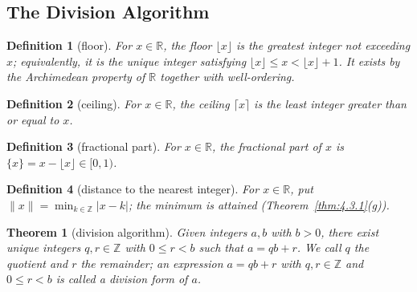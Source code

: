 \documentclass[11pt]{article}
\theoremstyle{ntstyle}
\newtheorem{theorem}{Theorem}[subsection]
\newtheorem{definition}{Definition}[subsection]
\begin{document}
\subsection{The Division Algorithm}

\begin{definition}[floor]\label{def:1.2.1}
	For $x\in\mathbb{R}$, the floor $\lfloor x\rfloor$ is the greatest integer not exceeding $x$; equivalently, it is the unique integer satisfying $\lfloor x\rfloor\le x<\lfloor x\rfloor+1$.
	It exists by the Archimedean property of $\mathbb{R}$ together with well-ordering.

\end{definition}
\begin{definition}[ceiling]\label{def:1.2.2}
	For $x\in\mathbb{R}$, the ceiling $\lceil x\rceil$ is the least integer greater than or equal to $x$.

\end{definition}
\begin{definition}[fractional part]\label{def:1.2.3}
	For $x\in\mathbb{R}$, the fractional part of $x$ is $\{x\}=x-\lfloor x\rfloor\in[0,1)$.

\end{definition}
\begin{definition}[distance to the nearest integer]\label{def:1.2.4}
	For $x\in\mathbb{R}$, put $\lVert x\rVert=\min_{k\in\mathbb{Z}}|x-k|$; the minimum is attained (Theorem~\ref{thm:4.3.1}(g)).

\end{definition}
\begin{theorem}[division algorithm]\label{thm:1.2.1}
	Given integers $a,b$ with $b>0$, there exist unique integers $q,r\in\mathbb{Z}$ with $0\le r<b$ such that $a=qb+r$.
	We call $q$ the quotient and $r$ the remainder; an expression $a=qb+r$ with $q,r\in\mathbb{Z}$ and $0\le r<b$ is called a division form of $a$.

\end{theorem}
\end{document}
